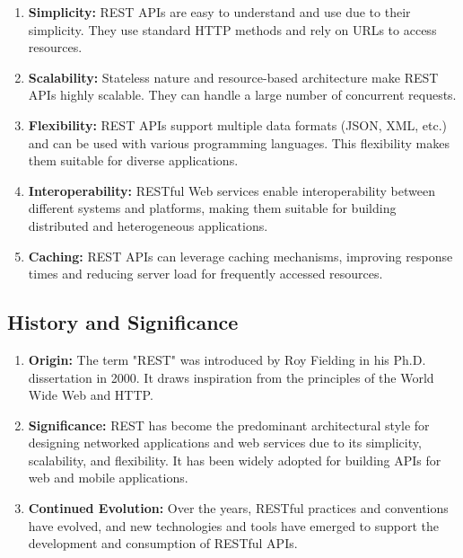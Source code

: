 \documentclass[11pt]{article}
\begin{document}
\begin{enumerate}
    \item \textbf{Simplicity:} REST APIs are easy to understand and use due to their simplicity. They use standard HTTP methods and rely on URLs to access resources.

    \item \textbf{Scalability:} Stateless nature and resource-based architecture make REST APIs highly scalable. They can handle a large number of concurrent requests.

    \item \textbf{Flexibility:} REST APIs support multiple data formats (JSON, XML, etc.) and can be used with various programming languages. This flexibility makes them suitable for diverse applications.

    \item \textbf{Interoperability:} RESTful Web services enable interoperability between different systems and platforms, making them suitable for building distributed and heterogeneous applications.

    \item \textbf{Caching:} REST APIs can leverage caching mechanisms, improving response times and reducing server load for frequently accessed resources.

\end{enumerate}

\subsection{History and Significance}

\begin{enumerate}
    \item \textbf{Origin:} The term "REST" was introduced by Roy Fielding in his Ph.D. dissertation in 2000. It draws inspiration from the principles of the World Wide Web and HTTP.

    \item \textbf{Significance:} REST has become the predominant architectural style for designing networked applications and web services due to its simplicity, scalability, and flexibility. It has been widely adopted for building APIs for web and mobile applications.

    \item \textbf{Continued Evolution:} Over the years, RESTful practices and conventions have evolved, and new technologies and tools have emerged to support the development and consumption of RESTful APIs.

\end{enumerate}
\end{document}

